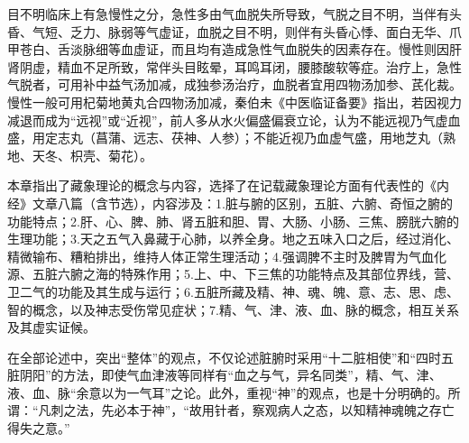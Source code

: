 \documentclass[12pt]{ctexbook}
\begin{document}
目不明临床上有急慢性之分，急性多由气血脱失所导致，气脱之目不明，当伴有头昏、气短、乏力、脉弱等气虚证，血脱之目不明，则伴有头昏心悸、面白无华、爪甲苍白、舌淡脉细等血虚证，而且均有造成急性气血脱失的因素存在。慢性则因肝肾阴虚，精血不足所致，常伴头目眩晕，耳鸣耳闭，腰膝酸软等症。治疗上，急性气脱者，可用补中益气汤加减，成独参汤治疗，血脱者宜用四物汤加参、芪化裁。慢性一般可用杞菊地黄丸合四物汤加减，秦伯未《中医临证备要》指出，若因视力减退而成为“远视”或“近视”，前人多从水火偏盛偏衰立论，认为不能远视乃气虚血盛，用定志丸（菖蒲、远志、茯神、人参）；不能近视乃血虚气盛，用地芝丸（熟地、天冬、枳壳、菊花）。

\xiaojie

本章指出了藏象理论的概念与内容，选择了在记载藏象理论方面有代表性的《内经》文章八篇（含节选），内容涉及：1.脏与腑的区别，五脏、六腑、奇恒之腑的功能特点；2.肝、心、脾、肺、肾五脏和胆、胃、大肠、小肠、三焦、膀胱六腑的生理功能；3.天之五气入鼻藏于心肺，以养全身。地之五味入口之后，经过消化、精微输布、糟粕排出，维持人体正常生理活动；4.强调脾不主时及脾胃为气血化源、五脏六腑之海的特殊作用；5.上、中、下三焦的功能特点及其部位界线，营、卫二气的功能及其生成与运行；6.五脏所藏及精、神、魂、魄、意、志、思、虑、智的概念，以及神志受伤常见症状；7.精、气、津、液、血、脉的概念，相互关系及其虚实证候。

在全部论述中，突出“整体”的观点，不仅论述脏腑时采用“十二脏相使”和“四时五脏阴阳”的方法，即使气血津液等同样有“血之与气，异名同类”，精、气、津、液、血、脉“余意以为一气耳”之论。此外，重视“神”的观点，也是十分明确的。所谓：“凡刺之法，先必本于神”，“故用针者，察观病人之态，以知精神魂魄之存亡得失之意。”

\ifx \allfiles \undefined
\end{document}
